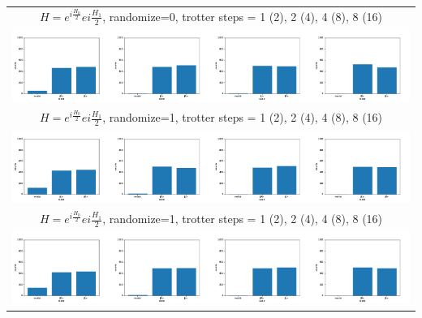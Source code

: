 \documentclass[]{standalone}
\begin{document}
\begin{tabular}{c}
$ H = e^{i\frac{H_0}{2}}e{i\frac{H_1}{2}} $, randomize=0, trotter steps = 1 (2), 2 (4), 4 (8), 8 (16) \\
\includegraphics[width=1.0\textwidth]{col_d_2_r_0_rc_1_steps_1_2_4_8.pdf} \\
$ H = e^{i\frac{H_0}{2}}e{i\frac{H_1}{2}} $, randomize=1, trotter steps = 1 (2), 2 (4), 4 (8), 8 (16) \\
\includegraphics[width=1.0\textwidth]{col_d_2_r_1_rc_0_steps_1_2_4_8.pdf} \\
$ H = e^{i\frac{H_0}{2}}e{i\frac{H_1}{2}} $, randomize=1, trotter steps = 1 (2), 2 (4), 4 (8), 8 (16) \\
\includegraphics[width=1.0\textwidth]{col_d_2_r_1_rc_1_steps_1_2_4_8.pdf} \\
\end{tabular}
\end{document}
